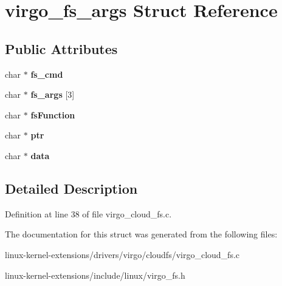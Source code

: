 \hypertarget{structvirgo__fs__args}{\section{virgo\-\_\-fs\-\_\-args Struct Reference}
\label{structvirgo__fs__args}
}
\subsection*{Public Attributes}
\begin{DoxyCompactItemize}
\item 
\hypertarget{structvirgo__fs__args_a645721280afce97fe1623ee2e9070a30}{char $\ast$ {\bfseries fs\-\_\-cmd}}\label{structvirgo__fs__args_a645721280afce97fe1623ee2e9070a30}

\item 
\hypertarget{structvirgo__fs__args_a541fa54ccd7f3802f811e500bab01e05}{char $\ast$ {\bfseries fs\-\_\-args} \mbox{[}3\mbox{]}}\label{structvirgo__fs__args_a541fa54ccd7f3802f811e500bab01e05}

\item 
\hypertarget{structvirgo__fs__args_a29dea63d768e71619a554588548b0993}{char $\ast$ {\bfseries fs\-Function}}\label{structvirgo__fs__args_a29dea63d768e71619a554588548b0993}

\item 
\hypertarget{structvirgo__fs__args_ae491124a48decddeaf953752a9328274}{char $\ast$ {\bfseries ptr}}\label{structvirgo__fs__args_ae491124a48decddeaf953752a9328274}

\item 
\hypertarget{structvirgo__fs__args_adecaa12ae9dfbfaa9957d9866e249e40}{char $\ast$ {\bfseries data}}\label{structvirgo__fs__args_adecaa12ae9dfbfaa9957d9866e249e40}

\end{DoxyCompactItemize}


\subsection{Detailed Description}


Definition at line 38 of file virgo\-\_\-cloud\-\_\-fs.\-c.



The documentation for this struct was generated from the following files\-:\begin{DoxyCompactItemize}
\item 
linux-\/kernel-\/extensions/drivers/virgo/cloudfs/virgo\-\_\-cloud\-\_\-fs.\-c\item 
linux-\/kernel-\/extensions/include/linux/virgo\-\_\-fs.\-h\end{DoxyCompactItemize}
